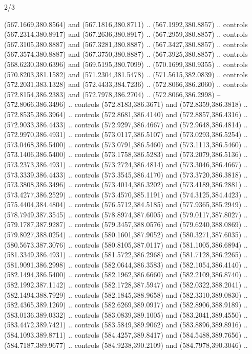 \begin{flagdescription}{2/3}
\begin{scope}[xshift=0.5\flaglength,yshift=0.5\flagwidth,scale=\flagwidth/495.65]
\begin{scope}[y=0.8pt, x=0.8pt, yscale=-1,shift={(-463.76,-309.78)}]
  (567.1669,380.8564) and (567.1816,380.8711) .. (567.1992,380.8857) .. controls
  (567.2314,380.8917) and (567.2636,380.8917) .. (567.2959,380.8857) .. controls
  (567.3105,380.8887) and (567.3281,380.8887) .. (567.3427,380.8857) .. controls
  (567.3574,380.8887) and (567.3750,380.8887) .. (567.3925,380.8857) .. controls
  (568.6230,380.6396) and (569.5195,380.7099) .. (570.1699,380.9355) .. controls
  (570.8203,381.1582) and (571.2304,381.5478) .. (571.5615,382.0839) .. controls
  (572.2031,383.1328) and (572.4433,384.7236) .. (572.8066,386.2060) .. controls
  (572.8154,386.2383) and (572.7978,386.2704) .. (572.8066,386.2998) --
  (572.8066,386.3496) .. controls (572.8183,386.3671) and (572.8359,386.3818) ..
  (572.8535,386.3964) .. controls (572.8681,386.4140) and (572.8857,386.4316) ..
  (572.9033,386.4433) .. controls (572.9297,386.4667) and (572.9648,386.4814) ..
  (572.9970,386.4931) .. controls (573.0117,386.5107) and (573.0293,386.5254) ..
  (573.0468,386.5400) .. controls (573.0791,386.5460) and (573.1113,386.5460) ..
  (573.1406,386.5400) .. controls (573.1758,386.5283) and (573.2079,386.5136) ..
  (573.2373,386.4931) .. controls (573.2724,386.4814) and (573.3046,386.4667) ..
  (573.3339,386.4433) .. controls (573.3545,386.4170) and (573.3720,386.3818) ..
  (573.3808,386.3496) .. controls (573.4014,386.3202) and (573.4189,386.2881) ..
  (573.4277,386.2529) .. controls (573.4570,385.1191) and (574.3125,384.4423) ..
  (575.4404,384.4804) .. controls (576.5712,384.5185) and (577.9365,385.2949) ..
  (578.7949,387.3545) .. controls (578.8974,387.6005) and (579.0117,387.8027) ..
  (579.1787,387.9287) .. controls (579.3457,388.0576) and (579.6240,388.0869) ..
  (579.8027,388.0254) .. controls (580.1601,387.9052) and (580.3271,387.6035) ..
  (580.5673,387.3076) .. controls (580.8105,387.0117) and (581.1005,386.6894) ..
  (581.3349,386.4931) .. controls (581.5722,386.2968) and (581.7128,386.2265) ..
  (581.9091,386.2998) .. controls (582.0644,386.3583) and (582.1054,386.4140) ..
  (582.1494,386.5400) .. controls (582.1962,386.6660) and (582.2109,386.8740) ..
  (582.1992,387.1142) .. controls (582.1728,387.5947) and (582.0322,388.2041) ..
  (582.1494,388.7929) .. controls (582.1845,388.9658) and (582.3310,389.0830) ..
  (582.4365,389.1269) .. controls (582.6269,389.0917) and (582.8906,388.9189) ..
  (583.0136,389.0332) .. controls (583.0839,389.1005) and (583.2041,389.4550) ..
  (583.4472,389.7421) .. controls (583.5849,389.9062) and (583.8896,389.8916) ..
  (584.1093,389.8711) .. controls (584.4257,389.8417) and (584.5488,389.7656) ..
  (584.7187,389.9677) .. controls (584.9238,390.2109) and (584.7978,390.3046) ..

\end{scope}
\end{scope}
\end{flagdescription}
